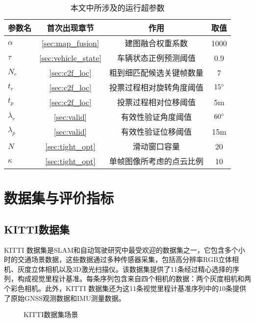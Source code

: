 \begin{table}
\centering
\caption{本文中所涉及的运行超参数}
\begin{tabular}{lccc}
\toprule
参数名 & 首次出现章节 & 作用 & 取值 \\
\midrule
$\alpha$ &  \ref{sec:map_fusion}  & 建图融合权重系数     & 1000 \\
$\tau$ & \ref{sec:vehicle_state} & 车辆状态正例预测阈值 & 0.9 \\
$N_c$ & \ref{sec:c2f_loc}  & 粗到细匹配候选关键帧数量 & 7   \\
$t_r$ &  \ref{sec:c2f_loc}  & 投票过程相对旋转角度阈值 & $15\degree$   \\
$t_p$ &  \ref{sec:c2f_loc}  & 投票过程相对位移阈值   & 5m    \\
$\lambda_r$ &  \ref{sec:valid}  & 有效性验证角度阈值    & $60\degree$   \\
$\lambda_p$ &  \ref{sec:valid}  & 有效性验证位移阈值    & 15m   \\
$N$ &  \ref{sec:tight_opt}  & 滑动窗口容量       & 20   \\
$\kappa$ &  \ref{sec:tight_opt}  & 单帧图像所考虑的点云比例 & 10  \\
\bottomrule
\end{tabular}
\label{tab:hyperparameters}
\end{table}

\section{数据集与评价指标}
\subsection{KITTI数据集}
KITTI 数据集\cite{Geiger2012CVPR}是SLAM和自动驾驶研究中最受欢迎的数据集之一，它包含多个小时的交通场景数据，这些数据通过多种传感器采集，包括高分辨率RGB立体相机、灰度立体相机以及3D激光扫描仪。该数据集提供了11条经过精心选择的序列，构成视觉里程计基准。每条序列包含来自四个相机的数据：两个灰度相机和两个彩色相机。此外，KITTI 数据集还为这11条视觉里程计基准序列中的10条提供了原始GNSS观测数据和IMU测量数据。

\begin{figure}
  \centering
  \caption{KITTI数据集场景}
  \label{fig:kitti_data}
\end{figure}

